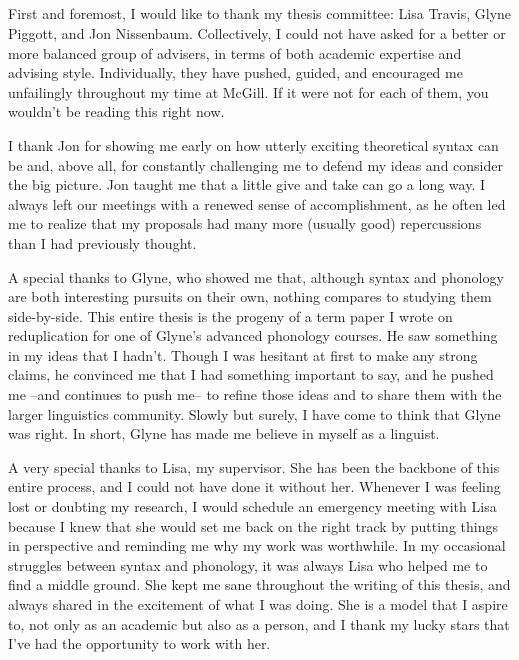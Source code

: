 \setcounter{footnote}{0}
\setcounter{section}{0}
\setcounter{ExNo}{0}
\section*{}
\singlespacing
\mbox{}\\\\
First and foremost, I would like to thank my thesis committee: Lisa Travis, Glyne Piggott, and Jon Nissenbaum. Collectively, I could not have asked for a better or more balanced group of advisers, in terms of both academic expertise and advising style. Individually, they have pushed, guided, and encouraged me unfailingly throughout my time at McGill. If it were not for each of them, you wouldn't be reading this right now.

I thank Jon for showing me early on how utterly exciting theoretical syntax can be and, above all, for constantly challenging me to defend my ideas and consider the big picture. Jon taught me that a little give and take can go a long way. I always left our meetings with a renewed sense of accomplishment, as he often led me to realize that my proposals had many more (usually good) repercussions than I had previously thought.

A special thanks to Glyne, who showed me that, although syntax and phonology are both interesting pursuits on their own, nothing compares to studying them side-by-side. This entire thesis is the progeny of a term paper I wrote on reduplication for one of Glyne's advanced phonology courses. He saw something in my ideas that I hadn't. Though I was hesitant at first to make any strong claims, he convinced me that I had something important to say, and he pushed me --and continues to push me-- to refine those ideas and to share them with the larger linguistics community. Slowly but surely, I have come to think that Glyne was right. In short, Glyne has made me believe in myself as a linguist.

A very special thanks to Lisa, my supervisor.  She has been the backbone of this entire process, and I could not have done it without her. Whenever I was feeling lost or doubting my research, I would schedule an emergency meeting with Lisa because I knew that she would set me back on the right track by putting things in perspective and reminding me why my work was worthwhile. In my occasional struggles between syntax and phonology, it was always Lisa who helped me to find a middle ground. She kept me sane throughout the writing of this thesis, and always shared in the excitement of what I was doing. She is a model that I aspire to, not only as an academic but also as a person, and I thank my lucky stars that I've had the opportunity to work with her.


